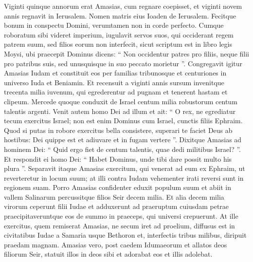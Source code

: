 \begin{biblechapter}
\begin{biblechapter}
\begin{biblechapter}
\begin{biblechapter}
\begin{biblechapter}
\begin{biblechapter}
\begin{biblechapter}
\begin{biblechapter}
\begin{biblechapter}
\begin{biblechapter}
\begin{biblechapter}
\begin{biblechapter}
\begin{biblechapter}
\begin{biblechapter}
\begin{biblechapter}
\begin{biblechapter}
\begin{biblechapter}
\begin{biblechapter}
\begin{biblechapter}
\begin{biblechapter}
\begin{biblechapter}
\begin{biblechapter}
\begin{biblechapter}
\begin{biblechapter}
\begin{biblechapter}
\verse Viginti quinque annorum erat Amasias, cum regnare coepisset, et viginti novem annis regnavit in Ierusalem. Nomen matris eius Ioaden de Ierusalem. 
\verse Fecitque bonum in conspectu Domini, verumtamen non in corde perfecto. 
\verse Cumque roboratum sibi videret imperium, iugulavit servos suos, qui occiderant regem patrem suum, 
\verse sed filios eorum non interfecit, sicut scriptum est in libro legis Moysi, ubi praecepit Dominus dicens: “ Non occidentur patres pro filiis, neque filii pro patribus suis, sed unusquisque in suo peccato morietur ”.
 \verse Congregavit igitur Amasias Iudam et constituit eos per familias tribunosque et centuriones in universo Iuda et Beniamin. Et recensuit a viginti annis sursum invenitque trecenta milia iuvenum, qui egrederentur ad pugnam et tenerent hastam et clipeum. 
\verse Mercede quoque conduxit de Israel centum milia robustorum centum talentis argenti.
 \verse Venit autem homo Dei ad illum et ait: “ O rex, ne egrediatur tecum exercitus Israel; non est enim Dominus cum Israel, cunctis filiis Ephraim. 
\verse Quod si putas in robore exercitus bella consistere, superari te faciet Deus ab hostibus: Dei quippe est et adiuvare et in fugam vertere ”. 
\verse Dixitque Amasias ad hominem Dei: “ Quid ergo fiet de centum talentis, quae dedi militibus Israel? ”. Et respondit ei homo Dei: “ Habet Dominus, unde tibi dare possit multo his plura ”. 
\verse Separavit itaque Amasias exercitum, qui venerat ad eum ex Ephraim, ut reverteretur in locum suum; at illi contra Iudam vehementer irati reversi sunt in regionem suam.
 \verse Porro Amasias confidenter eduxit populum suum et abiit in vallem Salinarum percussitque filios Seir decem milia. 
\verse Et alia decem milia virorum ceperunt filii Iudae et adduxerunt ad praeruptum cuiusdam petrae praecipitaveruntque eos de summo in praeceps, qui universi crepuerunt. 
\verse At ille exercitus, quem remiserat Amasias, ne secum iret ad proelium, diffusus est in civitatibus Iudae a Samaria usque Bethoron et, interfectis tribus milibus, diripuit praedam magnam.
 \verse Amasias vero, post caedem Idumaeorum et allatos deos filiorum Seir, statuit illos in deos sibi et adorabat eos et illis adolebat. 

\end{biblechapter}
\end{biblechapter}
\end{biblechapter}
\end{biblechapter}
\end{biblechapter}
\end{biblechapter}
\end{biblechapter}
\end{biblechapter}
\end{biblechapter}
\end{biblechapter}
\end{biblechapter}
\end{biblechapter}
\end{biblechapter}
\end{biblechapter}
\end{biblechapter}
\end{biblechapter}
\end{biblechapter}
\end{biblechapter}
\end{biblechapter}
\end{biblechapter}
\end{biblechapter}
\end{biblechapter}
\end{biblechapter}
\end{biblechapter}
\end{biblechapter}
